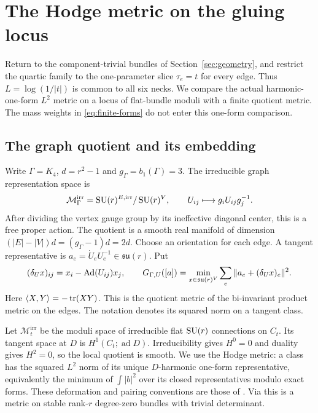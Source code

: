 \section{The Hodge metric on the gluing locus}\label{sec:moduli}

Return to the component-trivial bundles of
Section~\ref{sec:geometry}, and restrict the
quartic family to the one-parameter slice
$\tau_e=t$ for every edge. Thus
$L=\log(1/|t|)$ is common to all six necks.
We compare the actual harmonic-one-form
$L^2$ metric on a locus of flat-bundle moduli
with a finite quotient metric. The mass
weights in \eqref{eq:finite-forms} do not
enter this one-form comparison.

\subsection{The graph quotient and its embedding}
Write $\Gamma=K_4$, $d=r^2-1$ and
$g_\Gamma=b_1(\Gamma)=3$.
The irreducible graph representation space is
\[
 \mathcal M_\Gamma^{\mathrm{irr}}
   =\operatorname{SU}(r)^{E,\mathrm{irr}}/\operatorname{SU}(r)^V,
 \qquad U_{ij}\longmapsto g_iU_{ij}g_j^{-1}.
\]
After dividing the vertex gauge group by
its ineffective diagonal center, this is
a free proper action. The quotient is a
smooth real manifold of dimension
$(|E|-|V|)d=(g_\Gamma-1)d=2d$.
Choose an orientation for each edge.
A tangent representative is
$a_e=\dot U_eU_e^{-1}\in\mathfrak{su}(r)$.
Put
\begin{equation}\label{eq:graph-moduli-metric}
 (\delta_Ux)_{ij}=x_i-\operatorname{Ad}(U_{ij})x_j,\qquad
 G_{\Gamma,U}([a])
 =\min_{x\in\mathfrak{su}(r)^V}
                  \sum_e\|a_e+(\delta_Ux)_e\|^2 .
\end{equation}
Here $\langle X,Y\rangle=-\operatorname{tr}(XY)$.
This is the quotient metric of the
bi-invariant product metric on the edges.
The notation denotes its squared norm on
a tangent class.

Let $\mathcal M_t^{\mathrm{irr}}$ be the
moduli space of irreducible flat $\operatorname{SU}(r)$
connections on $C_t$. Its tangent space at
$D$ is $H^1(C_t;\operatorname{ad}D)$.
Irreducibility gives $H^0=0$ and duality
gives $H^2=0$, so the local quotient is
smooth. We use the Hodge metric: a class
has the squared $L^2$ norm of its unique
$D$-harmonic one-form representative,
equivalently the minimum of $\int|b|^2$
over its closed representatives modulo
exact forms. These deformation and
pairing conventions are those of
\cite[Section~1]{goldman}.
Via \cite{narasimhan-seshadri} this is
a metric on stable rank-$r$ degree-zero
bundles with trivial determinant.

